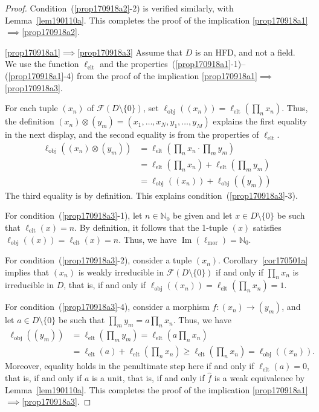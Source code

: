 \documentclass[reqno]{amsart}
\theoremstyle{plain}
\theoremstyle{definition}
\newcommand{\cat}[1]{\mathcal{#1}}
\newcommand{\catf}{\cat{F}}
\newcommand{\im}{\operatorname{Im}}
\newcommand{\bbn}{\mathbb{N}}
\renewcommand{\geq}{\geqslant}
\numberwithin{equation}{lem}
\newcommand{\zaks}[1]{\ell_{\text{#1}}}
\newcommand{\zaksmor}{\zaks{mor}}
\newcommand{\zaksobj}{\zaks{obj}}
\newcommand{\zakselt}{\zaks{elt}}
\begin{document}
\begin{proof}
Condition~(\ref{prop170918a2}-2) is verified similarly,  
with Lemma~\ref{lem190110a}.
This completes the proof of the implication \eqref{prop170918a1}$\implies$\eqref{prop170918a2}.

\eqref{prop170918a1}$\implies$\eqref{prop170918a3}
Assume that $D$ is an HFD,
and not a field. 
We use the function $\zakselt$ and the properties~(\ref{prop170918a1}-1)--(\ref{prop170918a1}-4)
from the proof of the 
implication \eqref{prop170918a1}$\implies$\eqref{prop170918a3}.

For 
each
tuple $(x_n)$ of $\catf(D\setminus\{0\})$, set
$\zaksobj((x_n))=\zakselt(\prod_nx_n)$.
Thus, the definition $(x_n)\otimes(y_m)=(x_1,\ldots,x_N,y_1,\ldots,y_M)$ explains the first equality in the next display,
and the second equality is from the properties of $\zakselt$.
\begin{align*}
\textstyle
\zaksobj((x_n)\otimes(y_m))
&\textstyle=\zakselt(\prod_nx_n\cdot\prod_my_m)\\
&\textstyle=\zakselt(\prod_nx_n)+\zakselt(\prod_my_m)\\
&\textstyle=\zaksobj((x_n))+\zaksobj((y_m))
\end{align*}
The third equality is by definition. 
This explains condition~(\ref{prop170918a3}-3).


For condition~(\ref{prop170918a3}-1), let $n\in\bbn_0$
 be given and let $x\in D\setminus\{0\}$ be such that
$\zakselt(x)=n$. By definition, it follows that the 1-tuple $(x)$ satisfies
$\zaksobj((x))=\zakselt(x)=n$. Thus, we have $\im(\zaksmor)=\bbn_0$.

For condition~(\ref{prop170918a3}-2), consider a tuple 
$(x_n)$.
Corollary~\ref{cor170501a} implies that
$(x_n)$ is 
weakly
irreducible in $\catf(D\setminus\{0\})$
if and only if
$\prod_nx_n$ is irreducible in $D$, that is, if and only if $\zaksobj((x_n))=\zakselt(\prod_nx_n)=1$.

For condition~(\ref{prop170918a3}-4), consider a morphism $\hat f\colon(x_n)\to(y_m)$,
and let $a\in D\setminus\{0\}$ be such that $\prod_my_m=a\prod_nx_n$.
Thus, we have
\begin{align*}
\zaksobj((y_m))
&\textstyle
=\zakselt(\prod_my_m)
\textstyle
=\zakselt(a\prod_nx_n)\\
&\textstyle
=\zakselt(a)+\zakselt(\prod_nx_n)
\textstyle
\geq\zakselt(\prod_nx_n)
\textstyle
=\zaksobj((x_n)).
\end{align*}
Moreover, equality holds in the penultimate step here if and only if $\zakselt(a)=0$,
that is, if and only if $a$ is a unit,
that is, if and only if $\hat f$ is a weak equivalence by
Lemma~\ref{lem190110a}.
This completes the proof of the implication \eqref{prop170918a1}$\implies$\eqref{prop170918a3}.




\end{proof}
\end{document}
